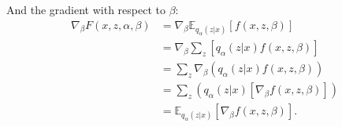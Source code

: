 \noindent And the gradient with respect to $\beta$:
\begin{align*}
    \nabla_{\beta} F(x, z, \alpha, \beta) &= \nabla_{\beta} \mathbb{E}_{q_{\alpha}(z|x)}[f(x, z, \beta)] \\
    &= \nabla_{\beta} \sum_z [q_{\alpha}(z|x)f(x, z, \beta)] \\
    &= \sum_z \nabla_{\beta} (q_{\alpha}(z|x)f(x, z, \beta)) \\
    &= \sum_z (q_{\alpha}(z|x) [\nabla_{\beta} f(x, z, \beta)]) \\
    &= \mathbb{E}_{q_{\alpha}(z|x)} [\nabla_{\beta} f(x, z, \beta)].
\end{align*}